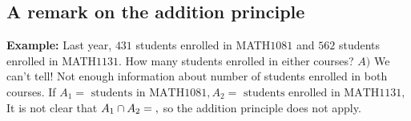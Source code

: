 \documentclass{article}
\begin{document}
\subsection{A remark on the addition principle}
\textbf{Example: }
\newline
Last year, $431$ students enrolled in MATH$1081$ and $562$ students enrolled in MATH$1131$. How many students enrolled in either courses?
\newline
\newline
$A) $ We can't tell! Not enough information about number of students enrolled in both courses.
\newline
If $A_1 = {\text{ students in MATH}1081 }, A_2 = {\text{ students enrolled in MATH}1131},$
\newline
\newline
It is not clear that $A_1 \cap A_2 = \null,$ so the addition principle does not apply.
\newpage
\end{document}

